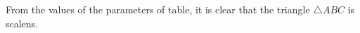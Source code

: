 %	
%	
%
%
%
%

From the values of the parameters of table, it is clear that the triangle $ \triangle ABC $ is scalens.\\

